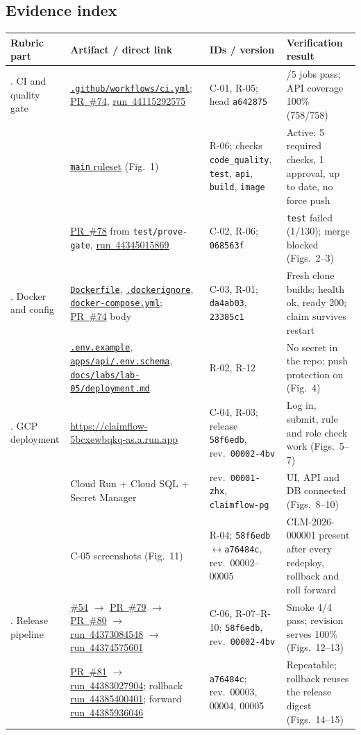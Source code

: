 \documentclass[11pt,a4paper]{article}
\newcommand{\repo}{https://github.com/beambeambeam/claimflow}
\newcommand{\sha}{a76484cf6d80e05b5c8fabf0044e9a5a7d0df124}
\newcommand{\pr}[1]{\href{\repo/pull/#1}{PR~\##1}}
\newcommand{\issue}[1]{\href{\repo/issues/#1}{\##1}}
\newcommand{\run}[1]{\href{\repo/actions/runs/#1}{run~#1}}
\newcommand{\file}[1]{\href{\repo/blob/\sha/#1}{\nolinkurl{#1}}}
\newcommand{\liveurl}{\url{https://claimflow-5bcxewbqkq-as.a.run.app}}
\begin{document}
\subsection*{Evidence index}
\begin{tabularx}{\textwidth}{@{}>{\raggedright\arraybackslash}p{1.9cm}>{\raggedright\arraybackslash}X>{\raggedright\arraybackslash}X>{\raggedright\arraybackslash}p{3.6cm}@{}}
\toprule
Rubric part & Artifact / direct link & IDs / version & Verification result \\
\midrule
1. CI and quality gate & \file{.github/workflows/ci.yml}; \pr{74}, \run{44115292575} & C-01, R-05; head \texttt{a642875} & 5/5 jobs pass; API coverage 100\% (758/758) \\
 & \href{\repo/rules}{\texttt{main} ruleset} (Fig.~1) & R-06; checks \texttt{code\_quality}, \texttt{test}, \texttt{api}, \texttt{build}, \texttt{image} & Active: 5 required checks, 1 approval, up to date, no force push \\
 & \pr{78} from \texttt{test/prove-gate}, \run{44345015869} & C-02, R-06; \texttt{068563f} & \texttt{test} failed (1/130); merge blocked (Figs.~2--3) \\
\midrule
2. Docker and config & \file{Dockerfile}, \file{.dockerignore}, \file{docker-compose.yml}; \pr{74} body & C-03, R-01; \texttt{da4ab03}, \texttt{23385c1} & Fresh clone builds; health ok, ready 200; claim survives restart \\
 & \file{.env.example}, \file{apps/api/.env.schema}, \file{docs/labs/lab-05/deployment.md} & R-02, R-12 & No secret in the repo; push protection on (Fig.~4) \\
\midrule
3. GCP deployment & \liveurl{} & C-04, R-03; release \texttt{58f6edb}, rev.\ \texttt{00002-4bv} & Log in, submit, rule and role check work (Figs.~5--7) \\
 & Cloud Run + Cloud SQL + Secret Manager & rev.\ \texttt{00001-zhx}, \texttt{claimflow-pg} & UI, API and DB connected (Figs.~8--10) \\
 & C-05 screenshots (Fig.~11) & R-04; \texttt{58f6edb}$\leftrightarrow$\texttt{a76484c}, rev.\ 00002--00005 & CLM-2026-000001 present after every redeploy, rollback and roll forward \\
\midrule
4. Release pipeline & \issue{54} $\to$ \pr{79} $\to$ \pr{80} $\to$ \run{44373084548} $\to$ \run{44374575601} & C-06, R-07--R-10; \texttt{58f6edb}, rev.\ \texttt{00002-4bv} & Smoke 4/4 pass; revision serves 100\% (Figs.~12--13) \\
 & \pr{81} $\to$ \run{44383027904}; rollback \run{44385400401}; forward \run{44385936046} & \texttt{a76484c}; rev.\ 00003, 00004, 00005 & Repeatable; rollback reuses the release digest (Figs.~14--15) \\
\bottomrule
\end{tabularx}
\normalsize
\end{document}
